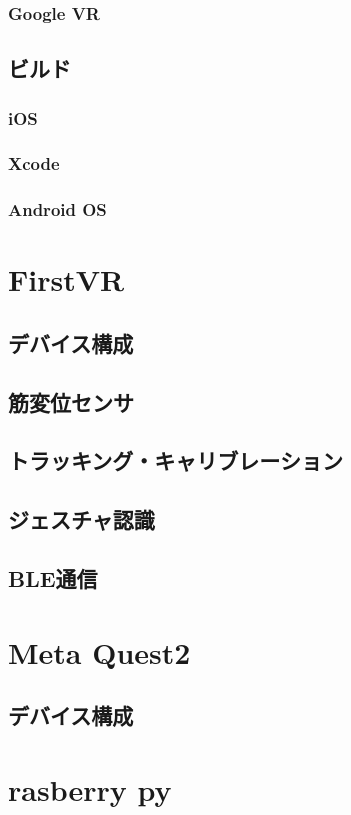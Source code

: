 \documentclass[report]{ltjsbook}
\begin{document}
			\subsubsection{Google VR}
		\subsection{ビルド}
			\subsubsection{iOS}
			\subsubsection{Xcode}
			\subsubsection{Android OS}
	\section{FirstVR}
		\subsection{デバイス構成}
		\subsection{筋変位センサ}
		\subsection{トラッキング・キャリブレーション}
		\subsection{ジェスチャ認識}
		\subsection{BLE通信}
	\section{Meta Quest2}
		\subsection{デバイス構成}
	\section{rasberry py}
	
\end{document}
